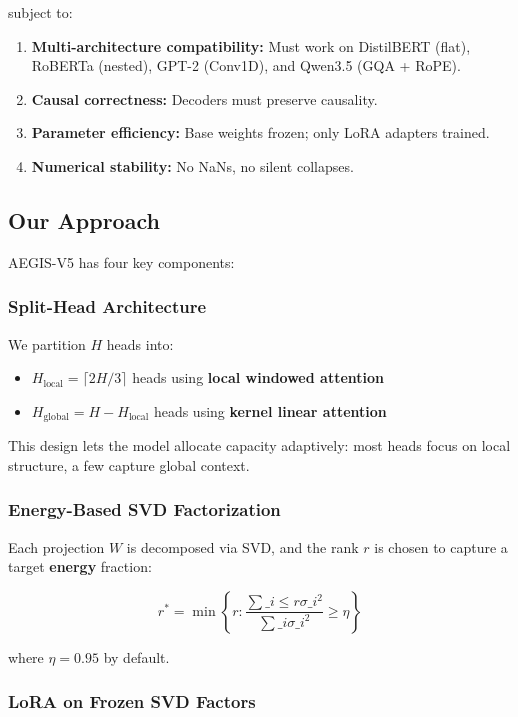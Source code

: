 subject to:

\begin{enumerate}
\item \textbf{Multi-architecture compatibility:} Must work on DistilBERT (flat),
  RoBERTa (nested), GPT-2 (Conv1D), and Qwen3.5 (GQA + RoPE).
\item \textbf{Causal correctness:} Decoders must preserve causality.
\item \textbf{Parameter efficiency:} Base weights frozen; only LoRA adapters trained.
\item \textbf{Numerical stability:} No NaNs, no silent collapses.

\end{enumerate}
\subsection{Our Approach}

AEGIS-V5 has four key components:

\subsubsection{Split-Head Architecture}

We partition $H$ heads into:

\begin{itemize}
\item $H_\text{local} = \lceil 2H/3 \rceil$ heads using \textbf{local windowed attention}
\item $H_\text{global} = H - H_\text{local}$ heads using \textbf{kernel linear attention}

\end{itemize}
This design lets the model allocate capacity adaptively: most heads focus 
on local structure, a few capture global context.

\subsubsection{Energy-Based SVD Factorization}

Each projection $W$ is decomposed via SVD, and the rank $r$ is chosen to 
capture a target \textbf{energy} fraction:

\[
r^* = \min \left\{ r : \frac{\sum\_{i \leq r} \sigma\_i^2}{\sum\_i \sigma\_i^2} \geq \eta \right\}
\]

where $\eta = 0.95$ by default.

\subsubsection{LoRA on Frozen SVD Factors}


